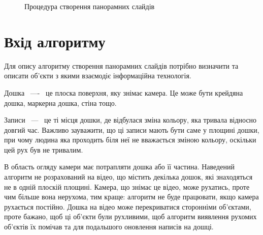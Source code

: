 \usetikzlibrary{arrows,positioning,shapes}
\begin{figure}[H]
    \begin{center}
    \end{center}
    \caption{Процедура створення панорамних слайдів
        \label{fig:pipeline}
    }
\end{figure}
\section{Вхід алгоритму}

Для опису алгоритму створення панорамних слайдів потрібно визначити та
описати об'єкти з якими взаємодіє інформаційна технологія.

Дошка ~----~ це плоска поверхня, яку знімає камера. Це може бути крейдяна
дошка, маркерна дошка, стіна тощо.

Записи ~---~ це ті місця дошки, де відбулася зміна кольору, яка тривала
відносно довгий час. Важливо зауважити, що ці записи мають бути
саме у площині дошки, при чому людина яка проходить біля неї не вважається
зміною кольору, оскільки цей рух був не тривалим.

В область огляду камери має потрапляти дошка або її частина. Наведений
алгоритм не розрахований на відео, що містить декілька дошок, які знаходяться
не в одній плоскій площині. Камера, що знімає це відео, може рухатись, проте
чим більше вона нерухома, тим краще: алгоритм не буде працювати, якщо камера
рухається постійно. Дошка на відео може перекриватися сторонніми об'єктами,
проте бажано, щоб ці об'єкти були рухливими, щоб алгоритм виявлення рухомих
об'єктів їх помічав та для подальшого оновлення написів на дошці.

